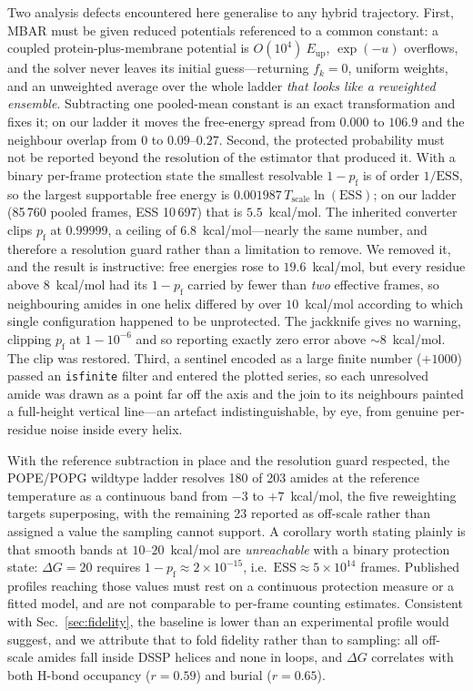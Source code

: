 \documentclass[journal=jctcce,manuscript=article,layout=twocolumn]{achemso}
\begin{document}
Two analysis defects encountered here generalise to any hybrid trajectory. First,
MBAR must be given reduced potentials referenced to a common constant: a coupled
protein-plus-membrane potential is $O(10^4)~E_\mathrm{up}$, $\exp(-u)$ overflows, and
the solver never leaves its initial guess---returning $f_k=0$, uniform weights, and
an unweighted average over the whole ladder \emph{that looks like a reweighted
ensemble}. Subtracting one pooled-mean constant is an exact transformation and fixes
it; on our ladder it moves the free-energy spread from $0.000$ to $106.9$ and the
neighbour overlap from $0$ to $0.09$--$0.27$. Second, the protected probability must not be
reported beyond the resolution of the estimator that produced it. With a binary
per-frame protection state the smallest resolvable $1-p_\mathrm{f}$ is of order
$1/\mathrm{ESS}$, so the largest supportable free energy is
$0.001987\,T_\mathrm{scale}\ln(\mathrm{ESS})$; on our ladder (85\,760 pooled
frames, ESS 10\,697) that is $5.5$~kcal/mol. The inherited converter clips
$p_\mathrm{f}$ at $0.99999$, a ceiling of $6.8$~kcal/mol---nearly the same number, and
therefore a resolution guard rather than a limitation to remove. We removed it, and the
result is instructive: free energies rose to $19.6$~kcal/mol, but every residue above
$8$~kcal/mol had its $1-p_\mathrm{f}$ carried by fewer than \emph{two} effective
frames, so neighbouring amides in one helix differed by over $10$~kcal/mol according to
which single configuration happened to be unprotected. The jackknife gives no warning,
clipping $p_\mathrm{f}$ at $1-10^{-6}$ and so reporting exactly zero error above
$\sim8$~kcal/mol. The clip was restored. Third, a sentinel encoded as a large finite
number ($+1000$) passed an \texttt{isfinite} filter and entered the plotted series, so
each unresolved amide was drawn as a point far off the axis and the join to its
neighbours painted a full-height vertical line---an artefact indistinguishable, by eye,
from genuine per-residue noise inside every helix.

With the reference subtraction in place and the resolution guard respected, the
POPE/POPG wildtype ladder resolves 180 of 203 amides at the reference temperature as a
continuous band from $-3$ to $+7$~kcal/mol, the five reweighting targets superposing,
with the remaining 23 reported as off-scale rather than assigned a value the sampling
cannot support. A corollary worth stating plainly is that smooth bands at
$10$--$20$~kcal/mol are \emph{unreachable} with a binary protection state:
$\Delta G=20$ requires $1-p_\mathrm{f}\approx2\times10^{-15}$, i.e.\
$\mathrm{ESS}\approx5\times10^{14}$ frames. Published profiles reaching those values
must rest on a continuous protection measure or a fitted model, and are not comparable
to per-frame counting estimates. Consistent with Sec.~\ref{sec:fidelity}, the baseline is lower
than an experimental profile would suggest, and we attribute that to fold fidelity
rather than to sampling: all off-scale amides fall inside DSSP helices and none in
loops, and $\Delta G$ correlates with both H-bond occupancy ($r=0.59$) and burial
($r=0.65$).
\end{document}
